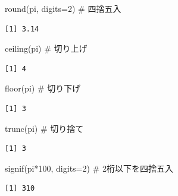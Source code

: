 \documentclass[
  letterpaper,
  DIV=11,
  numbers=noendperiod]{scrreprt}
\newenvironment{Shaded}{\begin{snugshade}}{\end{snugshade}}
\newcommand{\AttributeTok}[1]{\textcolor[rgb]{0.40,0.45,0.13}{#1}}
\newcommand{\CommentTok}[1]{\textcolor[rgb]{0.37,0.37,0.37}{#1}}
\newcommand{\DecValTok}[1]{\textcolor[rgb]{0.68,0.00,0.00}{#1}}
\newcommand{\FunctionTok}[1]{\textcolor[rgb]{0.28,0.35,0.67}{#1}}
\newcommand{\NormalTok}[1]{\textcolor[rgb]{0.00,0.23,0.31}{#1}}
\newcommand{\SpecialCharTok}[1]{\textcolor[rgb]{0.37,0.37,0.37}{#1}}
\begin{document}
\begin{Shaded}
\begin{Highlighting}[]
\FunctionTok{round}\NormalTok{(pi, }\AttributeTok{digits=}\DecValTok{2}\NormalTok{) }\CommentTok{\# 四捨五入}
\end{Highlighting}
\end{Shaded}

\begin{verbatim}
[1] 3.14
\end{verbatim}

\begin{Shaded}
\begin{Highlighting}[]
\FunctionTok{ceiling}\NormalTok{(pi) }\CommentTok{\# 切り上げ}
\end{Highlighting}
\end{Shaded}

\begin{verbatim}
[1] 4
\end{verbatim}

\begin{Shaded}
\begin{Highlighting}[]
\FunctionTok{floor}\NormalTok{(pi) }\CommentTok{\# 切り下げ}
\end{Highlighting}
\end{Shaded}

\begin{verbatim}
[1] 3
\end{verbatim}

\begin{Shaded}
\begin{Highlighting}[]
\FunctionTok{trunc}\NormalTok{(pi) }\CommentTok{\# 切り捨て}
\end{Highlighting}
\end{Shaded}

\begin{verbatim}
[1] 3
\end{verbatim}

\begin{Shaded}
\begin{Highlighting}[]
\FunctionTok{signif}\NormalTok{(pi}\SpecialCharTok{*}\DecValTok{100}\NormalTok{, }\AttributeTok{digits=}\DecValTok{2}\NormalTok{) }\CommentTok{\# 2桁以下を四捨五入}
\end{Highlighting}
\end{Shaded}

\begin{verbatim}
[1] 310
\end{verbatim}
\end{document}
